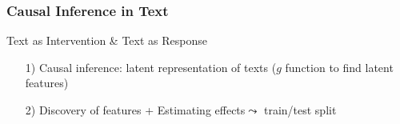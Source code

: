 \documentclass[xcolor=dvipsnames]{beamer}
\newenvironment{changemargin}[3]{%
 \begin{list}{}{%
 \setlength{\topsep}{0pt}%
 \setlength{\leftmargin}{#1}%
 \setlength{\rightmargin}{#2}%
 \setlength{\topmargin}{#3}%
 \setlength{\listparindent}{\parindent}%
 \setlength{\itemindent}{\parindent}%
 \setlength{\parsep}{\parskip}%
 }%
 \item[]}{\end{list}}
\begin{document}
\begin{frame}
\begin{changemargin}{-1cm}{+0cm}{-1cm}
\vskip-0.5cm
\Large

\begin{center}






\end{center}
\pause \pause \pause \pause \pause
\vskip0.5cm

\end{changemargin}

\end{frame}


\begin{frame}
\frametitle{Causal Inference in Text}

\Large
Text as Intervention \& Text as Response

\begin{itemize}
\item[1)] Causal inference: latent representation of texts ($g$ function to find latent features)
\item[2)] Discovery of features + Estimating effects$\leadsto$ train/test split
\end{itemize}




\end{frame}
\end{document}
